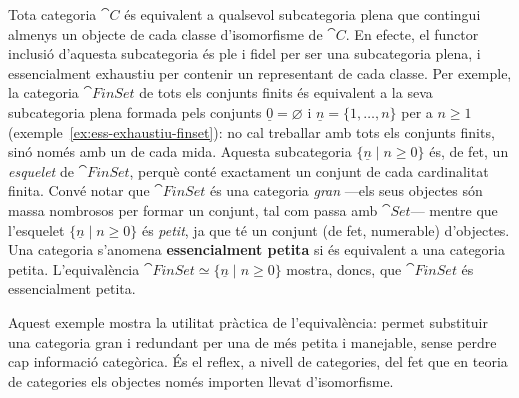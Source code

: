 \begin{exemple}
Tota categoria $\cat{C}$ és equivalent a qualsevol subcategoria plena que contingui almenys un objecte de cada classe d'isomorfisme de $\cat{C}$. En efecte, el functor inclusió d'aquesta subcategoria és ple i fidel per ser una subcategoria plena, i essencialment exhaustiu per contenir un representant de cada classe. Per exemple, la categoria $\cat{FinSet}$ de tots els conjunts finits és equivalent a la seva subcategoria plena formada pels conjunts $\underline{0}=\varnothing$ i $\underline{n}=\{1,\dots,n\}$ per a $n\geq 1$ (exemple~\ref{ex:ess-exhaustiu-finset}): no cal treballar amb tots els conjunts finits, sinó només amb un de cada mida. Aquesta subcategoria $\{\underline{n}\mid n\geq 0\}$ és, de fet, un \emph{esquelet} de $\cat{FinSet}$, perquè conté exactament un conjunt de cada cardinalitat finita. Convé notar que $\cat{FinSet}$ és una categoria \emph{gran} ---els seus objectes són massa nombrosos per formar un conjunt, tal com passa amb $\cat{Set}$--- mentre que l'esquelet $\{\underline{n}\mid n\geq 0\}$ és \emph{petit}, ja que té un conjunt (de fet, numerable) d'objectes. Una categoria s'anomena \textbf{essencialment petita} si és equivalent a una categoria petita. L'equivalència $\cat{FinSet}\simeq\{\underline{n}\mid n\geq 0\}$ mostra, doncs, que $\cat{FinSet}$ és essencialment petita.
\end{exemple}

\begin{observacio}
Aquest exemple mostra la utilitat pràctica de l'equivalència: permet substituir una categoria gran i redundant per una de més petita i manejable, sense perdre cap informació categòrica. És el reflex, a nivell de categories, del fet que en teoria de categories els objectes només importen llevat d'isomorfisme.
\end{observacio}

